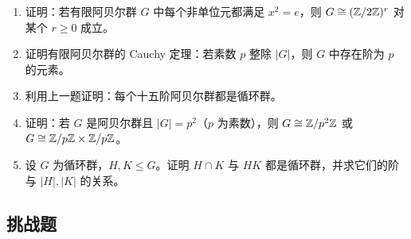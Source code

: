 \begin{enumerate}[start=31, label=\textbf{习题6.\arabic*.}, leftmargin=7em]
\[  \]
  \item \medium 证明：若有限阿贝尔群 $G$ 中每个非单位元都满足 $x^2=e$，则 $G\cong (\mathbb{Z}/2\mathbb{Z})^r$ 对某个 $r\ge0$ 成立。
  \item \medium 证明有限阿贝尔群的 Cauchy 定理：若素数 $p$ 整除 $|G|$，则 $G$ 中存在阶为 $p$ 的元素。
  \item \medium 利用上一题证明：每个十五阶阿贝尔群都是循环群。
  \item \medium 证明：若 $G$ 是阿贝尔群且 $|G|=p^2$（$p$ 为素数），则 $G\cong \mathbb{Z}/p^2\mathbb{Z}$ 或 $G\cong \mathbb{Z}/p\mathbb{Z} \times \mathbb{Z}/p\mathbb{Z}$。
  \item \medium 设 $G$ 为循环群，$H,K\le G$。证明 $H\cap K$ 与 $HK$ 都是循环群，并求它们的阶与 $|H|,|K|$ 的关系。
\end{enumerate}

\subsection*{挑战题}

